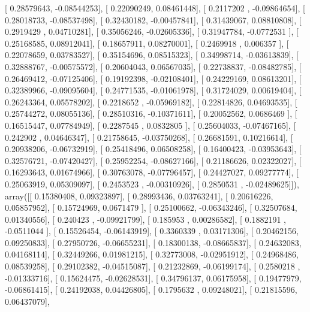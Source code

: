 \documentclass{article}
\begin{document}
       [ 0.28579643, -0.08544253],
       [ 0.22090249,  0.08461448],
       [ 0.2117202 , -0.09864654],
       [ 0.28018733, -0.08537498],
       [ 0.32430182, -0.00457841],
       [ 0.31439067,  0.08810808],
       [ 0.2919429 ,  0.04710281],
       [ 0.35056246, -0.02605336],
       [ 0.31947784, -0.0772531 ],
       [ 0.25168585,  0.08912041],
       [ 0.18657911,  0.08270001],
       [ 0.2469918 ,  0.006357  ],
       [ 0.22078659,  0.03783527],
       [ 0.35154696,  0.08515323],
       [ 0.34998714, -0.03613839],
       [ 0.32888767, -0.00575572],
       [ 0.20604043,  0.06567035],
       [ 0.22738837, -0.08482785],
       [ 0.26469412, -0.07125406],
       [ 0.19192398, -0.02108401],
       [ 0.24229169,  0.08613201],
       [ 0.32389966, -0.09095604],
       [ 0.24771535, -0.01061978],
       [ 0.31724029,  0.00619404],
       [ 0.26243364,  0.05578202],
       [ 0.2218652 , -0.05969182],
       [ 0.22814826,  0.04693535],
       [ 0.25744272,  0.08055136],
       [ 0.28510316, -0.10371611],
       [ 0.20052562,  0.0686469 ],
       [ 0.16515447,  0.07784949],
       [ 0.2287545 ,  0.0832805 ],
       [ 0.25604033, -0.07467165],
       [ 0.242902  ,  0.04646347],
       [ 0.21758645, -0.03750268],
       [ 0.26681591,  0.10216614],
       [ 0.20938206, -0.06732919],
       [ 0.25418496,  0.06508258],
       [ 0.16400423, -0.03953643],
       [ 0.32576721, -0.07420427],
       [ 0.25952254, -0.08627166],
       [ 0.21186626,  0.02322027],
       [ 0.16293643,  0.01674966],
       [ 0.30763078, -0.07796457],
       [ 0.24427027,  0.09277774],
       [ 0.25063919,  0.05309097],
       [ 0.2453523 , -0.00310926],
       [ 0.2850531 , -0.02489625]]), array([[ 0.15380408,  0.09323897],
       [ 0.28993436,  0.03763241],
       [ 0.20616226,  0.05857952],
       [ 0.15724969,  0.0671479 ],
       [ 0.25100662, -0.06343246],
       [ 0.32507684,  0.01340556],
       [ 0.240423  , -0.09921799],
       [ 0.185953  ,  0.00286582],
       [ 0.1882191 , -0.0511044 ],
       [ 0.15526454, -0.06143919],
       [ 0.3360339 ,  0.03171306],
       [ 0.20462156,  0.09250833],
       [ 0.27950726, -0.06655231],
       [ 0.18300138, -0.08665837],
       [ 0.24632083,  0.04168114],
       [ 0.32449266,  0.01981215],
       [ 0.32773008, -0.02951912],
       [ 0.24968486,  0.08539258],
       [ 0.29102382, -0.04515087],
       [ 0.21232869, -0.06199174],
       [ 0.2580218 , -0.01333716],
       [ 0.15624475, -0.02628531],
       [ 0.34796137,  0.06175958],
       [ 0.19477979, -0.06861415],
       [ 0.24192038,  0.04426805],
       [ 0.1795632 ,  0.09248021],
       [ 0.21815596,  0.06437079],
\end{document}
